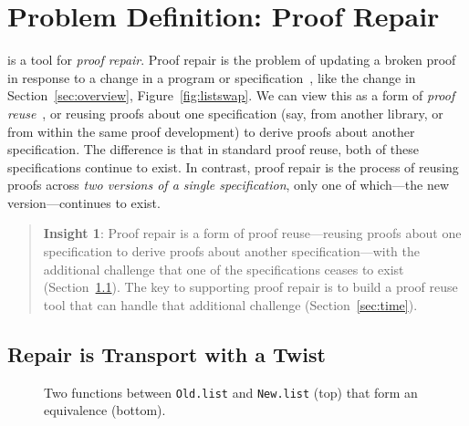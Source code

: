 \section{Problem Definition: Proof Repair}
\label{sec:key1}

\toolname is a tool for \textit{proof repair}.
Proof repair is the problem of updating a broken proof in response to a change in a program or specification~\cite{PGL-045, pumpkinpatch},
like the change in Section~\ref{sec:overview}, Figure~\ref{fig:listswap}.
We can view this as a form of 
\textit{proof reuse}~\cite{Ringer2019, felty1994generalization, caplan1995logical, pons2000generalization, johnsen2004theorem}, %
or reusing proofs about one specification (say, from another library, or from within the same proof development)
to derive proofs about another specification.
The difference is that in standard proof reuse, both of these specifications continue to exist.
In contrast, proof repair is the process of reusing proofs across \textit{two versions of a single specification},
only one of which---the new version---continues to exist.

\begin{quote}
\textbf{Insight 1}:
Proof repair is a form of proof reuse---reusing proofs about one specification to derive proofs about another specification---with 
the additional challenge that one of the specifications ceases to exist (Section~\ref{sec:repair}).
The key to supporting proof repair is to build a proof reuse
tool that can handle that additional challenge (Section~\ref{sec:time}).
\end{quote}

\subsection{Repair is Transport with a Twist}
\label{sec:repair}

\begin{figure}
\vspace{-0.3cm}
\caption{Two functions between \lstinline{Old.list} and \lstinline{New.list} (top) that form an equivalence (bottom).}
\label{fig:equivalence}
\end{figure}

